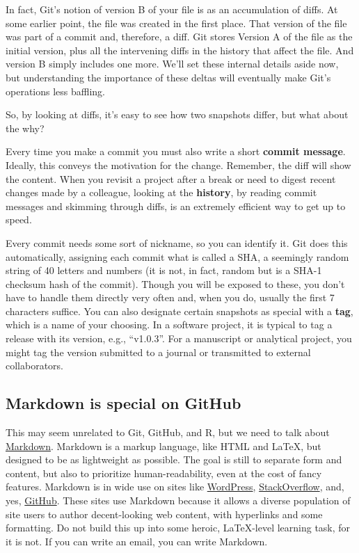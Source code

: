 \documentclass[12pt]{article}
\begin{document}
In fact, Git's notion of version B of your file is as an accumulation of
diffs. At some earlier point, the file was created in the first place.
That version of the file was part of a commit and, therefore, a diff.
Git stores Version A of the file as the initial version, plus all the
intervening diffs in the history that affect the file. And version B
simply includes one more. We'll set these internal details aside now,
but understanding the importance of these deltas will eventually make
Git's operations less baffling.

So, by looking at diffs, it's easy to see how two snapshots differ, but
what about the why?

Every time you make a commit you must also write a short \textbf{commit
message}. Ideally, this conveys the motivation for the change. Remember,
the diff will show the content. When you revisit a project after a break
or need to digest recent changes made by a colleague, looking at the
\textbf{history}, by reading commit messages and skimming through diffs,
is an extremely efficient way to get up to speed.

Every commit needs some sort of nickname, so you can identify it. Git
does this automatically, assigning each commit what is called a SHA, a
seemingly random string of 40 letters and numbers (it is not, in fact,
random but is a SHA-1 checksum hash of the commit). Though you will be
exposed to these, you don't have to handle them directly very often and,
when you do, usually the first 7 characters suffice. You can also
designate certain snapshots as special with a \textbf{tag}, which is a
name of your choosing. In a software project, it is typical to tag a
release with its version, e.g., ``v1.0.3''. For a manuscript or
analytical project, you might tag the version submitted to a journal or
transmitted to external collaborators.

\subsection{Markdown is special on
GitHub}\label{markdown-is-special-on-github}

This may seem unrelated to Git, GitHub, and R, but we need to talk about
\href{https://daringfireball.net/projects/markdown/syntax}{Markdown}.
Markdown is a markup language, like HTML and LaTeX, but designed to be
as lightweight as possible. The goal is still to separate form and
content, but also to prioritize human-readability, even at the cost of
fancy features. Markdown is in wide use on sites like
\href{https://en.support.wordpress.com/markdown/}{WordPress},
\href{https://stackoverflow.com/editing-help}{StackOverflow}, and, yes,
\href{https://help.github.com/categories/writing-on-github/}{GitHub}.
These sites use Markdown because it allows a diverse population of site
users to author decent-looking web content, with hyperlinks and some
formatting. Do not build this up into some heroic, LaTeX-level learning
task, for it is not. If you can write an email, you can write Markdown.
\end{document}
